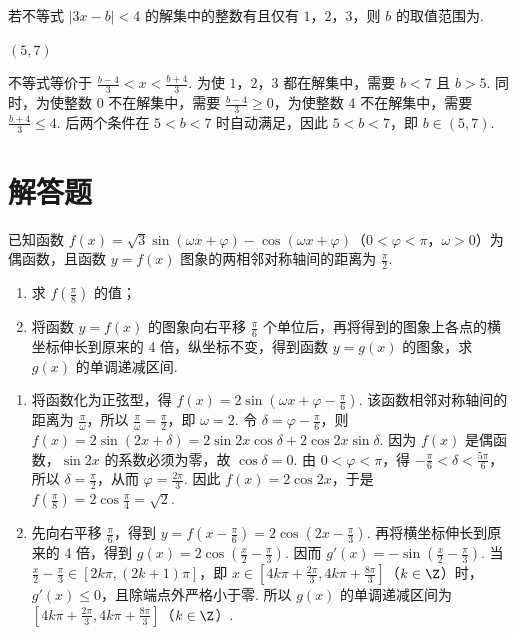 \begin{problem}
若不等式 \(|3x - b| < 4\) 的解集中的整数有且仅有 \(1\)，\(2\)，\(3\)，则 \(b\) 的取值范围为\fillinblank{}.
\end{problem}

\begin{answer}
\((5,7)\)
\end{answer}

\begin{solution}
不等式等价于
\(\frac{b-4}{3}<x<\frac{b+4}{3}\). 为使 \(1\)，\(2\)，\(3\) 都在解集中，需要 \(b<7\) 且 \(b>5\). 同时，为使整数 0 不在解集中，需要 \(\frac{b-4}{3}\geqslant0\)，为使整数 4 不在解集中，需要 \(\frac{b+4}{3}\leqslant4\). 后两个条件在 \(5<b<7\) 时自动满足，因此
\(5<b<7\)，即 \(b\in(5,7)\).
\end{solution}

\section{解答题}

\begin{problem}
已知函数 \(f(x) = \sqrt{3}\sin(\omega x + \varphi) - \cos(\omega x + \varphi)\)（\(0 < \varphi < \pi\)，\(\omega > 0\)）为偶函数，且函数 \(y = f(x)\) 图象的两相邻对称轴间的距离为 \(\frac{\pi}{2}\).
\begin{enumerate}
\item 求 \(f\left(\frac{\pi}{8}\right)\) 的值；
\item 将函数 \(y = f(x)\) 的图象向右平移 \(\frac{\pi}{6}\) 个单位后，再将得到的图象上各点的横坐标伸长到原来的 4 倍，纵坐标不变，得到函数 \(y = g(x)\) 的图象，求 \(g(x)\) 的单调递减区间.
\end{enumerate}
\end{problem}

\begin{solution}
\begin{enumerate}
\item 将函数化为正弦型，得
\(f(x)=2\sin\left(\omega x+\varphi-\frac\pi6\right)\). 该函数相邻对称轴间的距离为 \(\frac\pi\omega\)，所以 \(\frac\pi\omega=\frac\pi2\)，即 \(\omega=2\). 令 \(\delta=\varphi-\frac\pi6\)，则
\(f(x)=2\sin(2x+\delta)=2\sin2x\cos\delta+2\cos2x\sin\delta\). 因为 \(f(x)\) 是偶函数，\(\sin2x\) 的系数必须为零，故 \(\cos\delta=0\). 由 \(0<\varphi<\pi\)，得 \(-\frac\pi6<\delta<\frac{5\pi}{6}\)，所以 \(\delta=\frac\pi2\)，从而 \(\varphi=\frac{2\pi}{3}\). 因此 \(f(x)=2\cos2x\)，于是
\(f\left(\frac\pi8\right)=2\cos\frac\pi4=\sqrt2\).

\item 先向右平移 \(\frac\pi6\)，得到 \(y=f\left(x-\frac\pi6\right)=2\cos\left(2x-\frac\pi3\right)\). 再将横坐标伸长到原来的 4 倍，得到
\(g(x)=2\cos\left(\frac{x}{2}-\frac\pi3\right)\). 因而
\(g'(x)=-\sin\left(\frac{x}{2}-\frac\pi3\right)\). 当
\(\frac{x}{2}-\frac\pi3\in[2k\pi,(2k+1)\pi]\)，即
\(x\in\left[4k\pi+\frac{2\pi}{3},4k\pi+\frac{8\pi}{3}\right]\)（\(k\in\Z\)）时，\(g'(x)\leqslant0\)，且除端点外严格小于零. 所以 \(g(x)\) 的单调递减区间为
\(\left[4k\pi+\frac{2\pi}{3},4k\pi+\frac{8\pi}{3}\right]\)（\(k\in\Z\)）.
\end{enumerate}
\end{solution}

